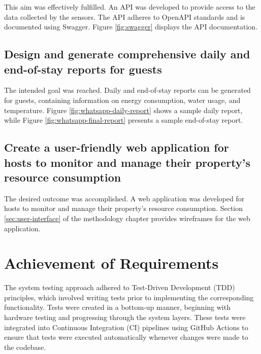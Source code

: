 This aim was effectively fulfilled. An API was developed to provide access to the data collected by the sensors. The API
adheres to OpenAPI standards and is documented using Swagger. Figure \ref{fig:swagger} displays the API documentation.

\subsection{Design and generate comprehensive daily and end-of-stay reports for guests}

The intended goal was reached. Daily and end-of-stay reports can be generated for guests, containing information on 
energy consumption, water usage, and temperature. Figure \ref{fig:whatsapp-daily-report} shows a sample daily report, 
while Figure \ref{fig:whatsapp-final-report} presents a sample end-of-stay report.

\subsection{Create a user-friendly web application for hosts to monitor and manage their property's resource consumption}

The desired outcome was accomplished. A web application was developed for hosts to monitor and manage their property's 
resource consumption. Section \ref{sec:user-interface} of the methodology chapter provides wireframes for the web 
application.

\section{Achievement of Requirements}



The system testing approach adhered to Test-Driven Development (TDD) principles, which involved writing tests prior to 
implementing the corresponding functionality. Tests were created in a bottom-up manner, beginning with hardware testing 
and progressing through the system layers. These tests were integrated into Continuous Integration (CI) pipelines using 
GitHub Actions \cite{GitHub2024} to ensure that tests were executed automatically whenever changes were made to the 
codebase.

